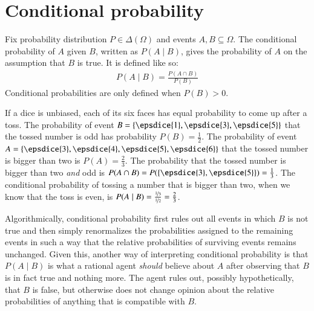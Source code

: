 \documentclass[nobib,nofonts]{tufte-handout}
\begin{document}
\section{Conditional probability}

Fix probability distribution $P \in \Delta(\Omega)$ and events $A,B \subseteq \Omega$. The
conditional probability of $A$ given $B$, written as $P(A \mid B)$, gives the probability of
$A$ on the assumption that $B$ is true. It is defined like so:
\begin{align*}
  P(A \mid B) = \frac{P(A \cap B)}{P(B)}
\end{align*}
Conditional probabilities are only defined when $P(B) > 0$.


\begin{example}
  If a dice is unbiased, each of its six faces has equal probability to come up after a toss. The
  probability of event $B = \set{\epsdice{1}, \epsdice{3}, \epsdice{5}}$ that the tossed number
  is odd has probability $P(B) = \frac{1}{2}$. The probability of event $A = \set{\epsdice{3}, \epsdice{4},
    \epsdice{5}, \epsdice{6}}$ that the tossed number is bigger than two is $P(A) =
  \frac{2}{3}$. The probability that the tossed number is bigger than two \emph{and} odd is
  $P(A \cap B) = P(\set{\epsdice{3}, \epsdice{5}}) = \frac{1}{3}$. The conditional probability
  of tossing a number that is bigger than two, when we know that the toss is even, is $P(A \mid
  B) = \frac{\nicefrac{1}{3}}{\nicefrac{1}{2}} = \frac{2}{3}$.
\end{example}

Algorithmically, conditional probability first rules out all events in which $B$ is not true
and then simply renormalizes the probabilities assigned to the remaining events in such a way
that the relative probabilities of surviving events remains unchanged. Given this, another way
of interpreting conditional probability is that $P(A \mid B)$ is what a rational agent
\emph{should} believe about $A$ after observing that $B$ is in fact true and nothing more. The
agent rules out, possibly hypothetically, that $B$ is false, but otherwise does not change
opinion about the relative probabilities of anything that is compatible with $B$.
\end{document}
